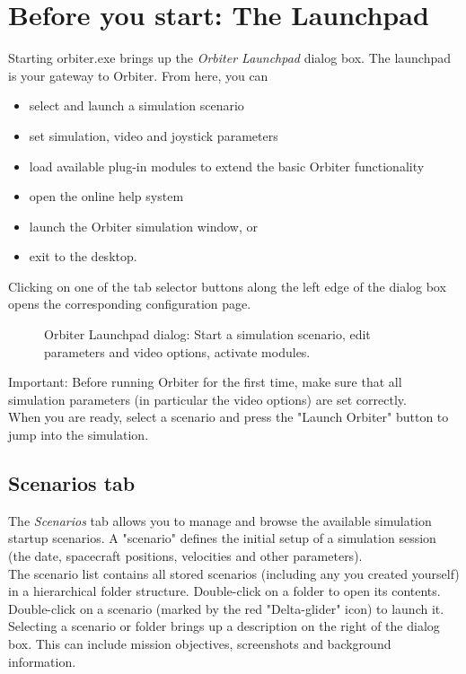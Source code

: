 \documentclass[Orbiter User Manual.tex]{subfiles}
\begin{document}
\section{Before you start: The Launchpad}
Starting orbiter.exe brings up the \textit{Orbiter Launchpad} dialog box. The launchpad is your gateway to Orbiter. From here, you can

\begin{itemize}
\item select and launch a simulation scenario
\item set simulation, video and joystick parameters
\item load available plug-in modules to extend the basic Orbiter functionality
\item open the online help system
\item launch the Orbiter simulation window, or
\item exit to the desktop.
\end{itemize}

\noindent
Clicking on one of the tab selector buttons along the left edge of the dialog box opens the corresponding configuration page.

\begin{figure}[H]
	\centering
	\caption{Orbiter Launchpad dialog: Start a simulation scenario, edit parameters and video options, activate modules.}
\end{figure}

\noindent
Important: Before running Orbiter for the first time, make sure that all simulation parameters (in particular the video options) are set correctly.\\
When you are ready, select a scenario and press the "Launch Orbiter" button to jump into the simulation.


\subsection{Scenarios tab}
The \textit{Scenarios} tab allows you to manage and browse the available simulation startup scenarios. A "scenario" defines the initial setup of a simulation session (the date, spacecraft positions, velocities and other parameters).\\
The scenario list contains all stored scenarios (including any you created yourself) in a hierarchical folder structure. Double-click on a folder to open its contents. Double-click on a scenario (marked by the red "Delta-glider" icon) to launch it.\\
Selecting a scenario or folder brings up a description on the right of the dialog box. This can include mission objectives, screenshots and background information.
\end{document}
